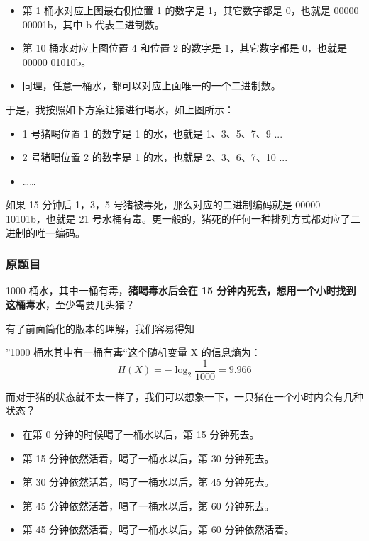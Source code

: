 \documentclass[12pt]{article}
\begin{document}
\begin{itemize}[itemindent=2em]
    \item 第 1 桶水对应上图最右侧位置 1 的数字是 1，其它数字都是 0，也就是 00000 00001b，其中 b 代表二进制数。
    
    \item 第 10 桶水对应上图位置 4 和位置 2 的数字是 1，其它数字都是 0，也就是 00000 01010b。
    
    \item 同理，任意一桶水，都可以对应上面唯一的一个二进制数。
\end{itemize}

于是，我按照如下方案让猪进行喝水，如上图所示：

\begin{itemize}[itemindent=2em]
    \item 1 号猪喝位置 1 的数字是 1 的水，也就是 1、3、5、7、9 ...
    
    \item 2 号猪喝位置 2 的数字是 1 的水，也就是 2、3、6、7、10 ...
    
    \item ……
\end{itemize}

如果 15 分钟后 1，3，5 号猪被毒死，那么对应的二进制编码就是 00000 10101b，也就是 21 号水桶有毒。更一般的，猪死的任何一种排列方式都对应了二进制的唯一编码。

\subsubsection{原题目}
1000 桶水，其中一桶有毒，\textbf{猪喝毒水后会在 15 分钟内死去，想用一个小时找到这桶毒水}，至少需要几头猪？

有了前面简化的版本的理解，我们容易得知

”1000 桶水其中有一桶有毒“这个随机变量 X 的信息熵为：
$$H(X)=-\log_2{\frac{1}{1000}} = 9.966$$

而对于猪的状态就不太一样了，我们可以想象一下，一只猪在一个小时内会有几种状态？
\begin{itemize}[itemindent=2em]
    \item 在第 0 分钟的时候喝了一桶水以后，第 15 分钟死去。
    
    \item 第 15 分钟依然活着，喝了一桶水以后，第 30 分钟死去。
    
    \item 第 30 分钟依然活着，喝了一桶水以后，第 45 分钟死去。
    
    \item 第 45 分钟依然活着，喝了一桶水以后，第 60 分钟死去。
    
    \item 第 45 分钟依然活着，喝了一桶水以后，第 60 分钟依然活着。
\end{itemize}
\end{document}
